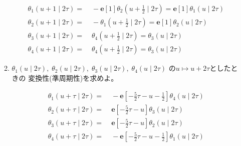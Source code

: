 \documentclass[12pt,b5paper]{ltjsarticle}
\begin{document}
\begin{enumerate}
\begin{enumerate}
             \begin{align}
              \theta_{1} (u +1 \mid 2\tau)
              =&\;
              -\mathbf{e}[1] \theta_{2} (u+\frac{1}{2} \mid 2\tau )
              =
              \mathbf{e}[1] \theta_{1} \left(u \mid 2\tau \right)\\
%
              \theta_{2} (u +1 \mid 2\tau)
              =&\;
              -\theta_{1} (u+\frac{1}{2} \mid 2\tau )
              =
              \mathbf{e}[1] \theta_{2} \left(u \mid 2\tau \right)\\
%
              \theta_{3} (u +1 \mid 2\tau)
              =&\; \theta_{4} (u+\frac{1}{2} \mid 2\tau)
              = \theta_{3} (u \mid 2\tau)\\
%
              \theta_{4} (u +1 \mid 2\tau)
              =&\; \theta_{4} (u+\frac{1}{2} \mid 2\tau)
              = \theta_{3} (u \mid 2\tau)
             \end{align}




             \hrulefill

        \item
             $\theta_{1}(u\mid 2\tau),\;\theta_{2}(u\mid 2\tau)
             ,\;\theta_{3}(u\mid 2\tau),\;\theta_{4}(u\mid 2\tau)$
             の$u \mapsto u+2\tau$としたときの
             変換性(準周期性)を求めよ。

             \dotfill

             \begin{align}
              \theta_{1} (u + \tau \mid 2\tau)
              =&\; -\mathbf{e}[-\frac{5}{2}\tau-u-\frac{1}{2}]
              \theta_{4} (u \mid 2\tau )\\
              \theta_{2} (u+\tau \mid 2\tau )
              =&\; \mathbf{e}[-\frac{5}{2}\tau-u]
              \theta_{3} (u \mid 2\tau )\\
              \theta_{3} (u+\tau \mid 2\tau )
              =&\; \mathbf{e}[-\frac{5}{2}\tau-u]
              \theta_{2} (u \mid 2\tau)\\
              \theta_{4} (u+\tau \mid 2\tau )
              =&\; -\mathbf{e}[-\frac{5}{2}\tau-u-\frac{1}{2}]
              \theta_{1} (u \mid 2\tau )
             \end{align}


\end{enumerate}
\end{enumerate}
\end{document}
